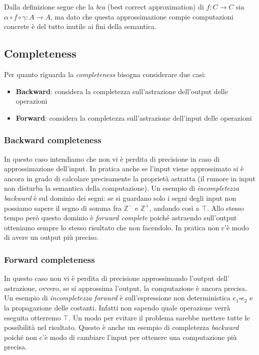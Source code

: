 \documentclass[a4paper, 10pt]{book}
\begin{document}
Dalla definizione segue che la \emph{bca} (best correct approximation) di $f : C \to C$ sia 
$\alpha \circ f \circ \gamma : A \to A$, ma dato che questa approssimazione compie computazioni concrete
è del tutto inutile ai fini della semantica.

\subsection{Completeness}
Per quanto riguarda la \emph{completeness} bisogna considerare due casi:
\begin{itemize}
    \item \textbf{Backward}: considera la completezza sull'astrazione dell'output delle operazioni
    \item \textbf{Forward}: considera  la completezza sull'astrazione dell'input delle operazioni
\end{itemize}

\subsubsection{Backward completeness}
In questo caso intendiamo che non vi è perdita di precisione in caso di approssimazione dell'input.
In pratica anche se l'input viene approssimato si è ancora in grado di calcolare precisamente la proprietà
astratta (il rumore in input non disturba la semantica della computazione).
\newline
Un esempio di \emph{incompletezza backward} è sul dominio dei segni: se si guardano solo i segni degli
input non possiamo sapere il segno di somma fra $\mathbb{Z}^-$ e $\mathbb{Z}^+$, andando così a $\top$. Allo stesso tempo
però questo dominio è \emph{forward complete} poiché astraendo sull'output otteniamo sempre lo stesso 
risultato che non facendolo. In pratica non c'è modo di avere un output più preciso.

\subsubsection{Forward completeness}
In questo caso non vi è perdita di precisione approssimando l'output dell' astrazione, ovvero, se si 
approssima l'output, la computazione è ancora precisa.
\newline
Un esempio di \emph{incompletezza forward} è sull'espressione non deterministica $e_1 \square e_2$ e la 
propagazione delle costanti. Infatti non sapendo quale operazione verrà eseguita otterremo $\top$. Un modo per
evitare il problema sarebbe mettere tutte le possibilità nel risultato. Questo è anche un esempio di 
completezza \emph{backward} poiché non c'è modo di cambiare l'input per ottenere una computazione più precisa.
\end{document}
